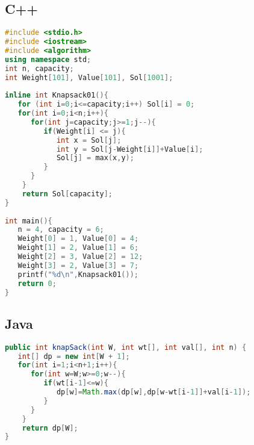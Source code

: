 \subsection{C++}

\begin{lstlisting}[language=C++]
#include <stdio.h>
#include <iostream>
#include <algorithm>
using namespace std;
int n, capacity;
int Weight[101], Value[101], Sol[1001];
	
inline int Knapsack01(){
   for (int i=0;i<=capacity;i++) Sol[i] = 0;
   for(int i=0;i<n;i++){
      for(int j=capacity;j>=1;j--){
         if(Weight[i] <= j){
            int x = Sol[j];
            int y = Sol[j-Weight[i]]+Value[i];
            Sol[j] = max(x,y);
         }
      }
    }
    return Sol[capacity];
}
	
int main(){
   n = 4, capacity = 6;
   Weight[0] = 1, Value[0] = 4;
   Weight[1] = 2, Value[1] = 6;
   Weight[2] = 3, Value[2] = 12;
   Weight[3] = 2, Value[3] = 7;
   printf("%d\n",Knapsack01());
   return 0;
}
\end{lstlisting}


\subsection{Java}
\begin{lstlisting}[language=Java]
public int knapSack(int W, int wt[], int val[], int n) {
   int[] dp = new int[W + 1];
   for(int i=1;i<n+1;i++){
      for(int w=W;w>=0;w--){
      	 if(wt[i-1]<=w){
            dp[w]=Math.max(dp[w],dp[w-wt[i-1]]+val[i-1]);
         }
      }
    }
    return dp[W];
}
\end{lstlisting}